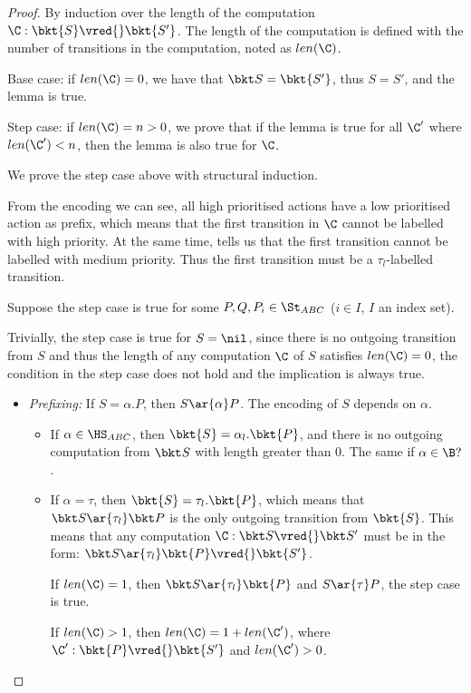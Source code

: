 \begin{proof}
  By induction over the length of the computation $\C : \bkt{S} \vred{} \bkt{S'}$.
  The length of the computation is defined with the number of transitions in the computation, noted as $len(\C)$.

  Base case: if $len(\C) = 0$, we have that $\bkt S = \bkt{S'}$, thus $S = S'$, and the lemma is true.

  Step case: if $len(\C) = n > 0$, we prove that if the lemma is true for all $\C'$ where $len(\C') < n$, then the lemma is also true for $\C$.

  We prove the step case above with structural induction.

  From the encoding we can see, all high prioritised actions have a low prioritised action as prefix, which means that the first transition in $\C$ cannot be labelled with high priority.
  At the same time,  tells us that the first transition cannot be labelled with medium priority.
  Thus the first transition must be a $\tau_l$-labelled transition.

  Suppose the step case is true for some $P, Q, P_i \in \St_{ABC}$ ($i\in I$, $I$ an index set).

  Trivially, the step case is true for $S=\nil$, since there is no outgoing transition from $S$ and thus the length of any computation $\C$ of $S$ satisfies $len(\C) = 0$, the condition in the step case does not hold and the implication is always true.
  \begin{itemize}
    \item \emph{Prefixing:}
    If $S=\alpha.P$, then $S\ar{\alpha}P$.
    The encoding of $S$ depends on $\alpha$.
    \begin{itemize}
      \item If $\alpha\in\HS_{ABC}$, then $\bkt{S} = \alpha_l.\bkt{P}$, and there is no outgoing computation from $\bkt S$ with length greater than $0$.
      The same if $\alpha\in\B?$.
      \item If $\alpha = \tau$, then $\bkt{S} = \tau_l.\bkt{P}$, which means that $\bkt S \ar{\tau_l} \bkt P$ is the only outgoing transition from $\bkt{S}$.
      This means that any computation $\C : \bkt S \vred{} \bkt S'$ must be in the form: $\bkt S \ar{\tau_l} \bkt{P}\vred{}\bkt{S'}$.

      If $len(\C) = 1$, then $\bkt S \ar{\tau_l} \bkt{P}$ and $S\ar{\tau}P$, the step case is true.

      If $len(\C) > 1$, then $len(\C) = 1 + len(\C')$, where $\C' : \bkt{P}\vred{}\bkt{S'}$ and $len(\C') > 0$.



\end{itemize}
\end{itemize}
\end{proof}

